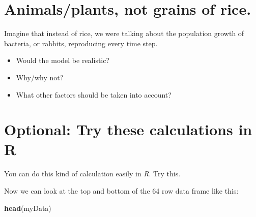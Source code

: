 \documentclass[
  a4paper]{book}
\newenvironment{Shaded}{\begin{snugshade}}{\end{snugshade}}
\newcommand{\AttributeTok}[1]{\textcolor[rgb]{0.13,0.29,0.53}{#1}}
\newcommand{\ConstantTok}[1]{\textcolor[rgb]{0.56,0.35,0.01}{#1}}
\newcommand{\ControlFlowTok}[1]{\textcolor[rgb]{0.13,0.29,0.53}{\textbf{#1}}}
\newcommand{\DecValTok}[1]{\textcolor[rgb]{0.00,0.00,0.81}{#1}}
\newcommand{\FunctionTok}[1]{\textcolor[rgb]{0.13,0.29,0.53}{\textbf{#1}}}
\newcommand{\NormalTok}[1]{#1}
\newcommand{\OtherTok}[1]{\textcolor[rgb]{0.56,0.35,0.01}{#1}}
\newcommand{\SpecialCharTok}[1]{\textcolor[rgb]{0.81,0.36,0.00}{\textbf{#1}}}
\providecommand{\tightlist}{%
  \setlength{\itemsep}{0pt}\setlength{\parskip}{0pt}}
\begin{document}
\hypertarget{animalsplants-not-grains-of-rice.}{%
\section{Animals/plants, not grains of rice.}\label{animalsplants-not-grains-of-rice.}}

Imagine that instead of rice, we were talking about the population growth of bacteria, or rabbits, reproducing every time step.

\begin{itemize}
\tightlist
\item
  Would the model be realistic?
\item
  Why/why not?
\item
  What other factors should be taken into account?
\end{itemize}

\hypertarget{optional-try-these-calculations-in-r}{%
\section{Optional: Try these calculations in R}\label{optional-try-these-calculations-in-r}}

You can do this kind of calculation easily in \emph{R}. Try this.

\begin{Shaded}
\end{Shaded}

Now we can look at the top and bottom of the 64 row data frame like this:

\begin{Shaded}
\begin{Highlighting}[]
\FunctionTok{head}\NormalTok{(myData)}
\end{Highlighting}
\end{Shaded}
\end{document}
